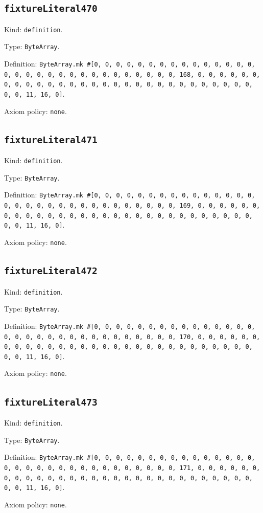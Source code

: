\documentclass[11pt]{article}
\begin{document}
\subsection*{\texttt{fixtureLiteral470}}
\noindent Kind: \texttt{definition}.\par
\noindent Type: \texttt{ByteArray}.\par
\noindent Definition: \texttt{ByteArray.mk \#[0, 0, 0, 0, 0, 0, 0, 0, 0, 0, 0, 0, 0, 0, 0, 0, 0, 0, 0, 0, 0, 0, 0, 0, 0, 0, 0, 0, 0, 0, 0, 168, 0, 0, 0, 0, 0, 0, 0, 0, 0, 0, 0, 0, 0, 0, 0, 0, 0, 0, 0, 0, 0, 0, 0, 0, 0, 0, 0, 0, 0, 0, 0, 11, 16, 0]}.\par
\noindent Axiom policy: \texttt{none}.\par
\subsection*{\texttt{fixtureLiteral471}}
\noindent Kind: \texttt{definition}.\par
\noindent Type: \texttt{ByteArray}.\par
\noindent Definition: \texttt{ByteArray.mk \#[0, 0, 0, 0, 0, 0, 0, 0, 0, 0, 0, 0, 0, 0, 0, 0, 0, 0, 0, 0, 0, 0, 0, 0, 0, 0, 0, 0, 0, 0, 0, 169, 0, 0, 0, 0, 0, 0, 0, 0, 0, 0, 0, 0, 0, 0, 0, 0, 0, 0, 0, 0, 0, 0, 0, 0, 0, 0, 0, 0, 0, 0, 0, 11, 16, 0]}.\par
\noindent Axiom policy: \texttt{none}.\par
\subsection*{\texttt{fixtureLiteral472}}
\noindent Kind: \texttt{definition}.\par
\noindent Type: \texttt{ByteArray}.\par
\noindent Definition: \texttt{ByteArray.mk \#[0, 0, 0, 0, 0, 0, 0, 0, 0, 0, 0, 0, 0, 0, 0, 0, 0, 0, 0, 0, 0, 0, 0, 0, 0, 0, 0, 0, 0, 0, 0, 170, 0, 0, 0, 0, 0, 0, 0, 0, 0, 0, 0, 0, 0, 0, 0, 0, 0, 0, 0, 0, 0, 0, 0, 0, 0, 0, 0, 0, 0, 0, 0, 11, 16, 0]}.\par
\noindent Axiom policy: \texttt{none}.\par
\subsection*{\texttt{fixtureLiteral473}}
\noindent Kind: \texttt{definition}.\par
\noindent Type: \texttt{ByteArray}.\par
\noindent Definition: \texttt{ByteArray.mk \#[0, 0, 0, 0, 0, 0, 0, 0, 0, 0, 0, 0, 0, 0, 0, 0, 0, 0, 0, 0, 0, 0, 0, 0, 0, 0, 0, 0, 0, 0, 0, 171, 0, 0, 0, 0, 0, 0, 0, 0, 0, 0, 0, 0, 0, 0, 0, 0, 0, 0, 0, 0, 0, 0, 0, 0, 0, 0, 0, 0, 0, 0, 0, 11, 16, 0]}.\par
\noindent Axiom policy: \texttt{none}.\par
\end{document}
